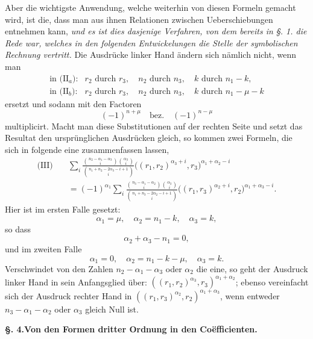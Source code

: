 \documentclass[10pt]{article}
\begin{document}
Aber die wichtigste Anwendung, welche weiterhin von diesen Formeln gemacht wird, ist die, dass man aus ihnen Relationen zwischen Ueberschiebungen entnehmen kann, \emph{und es ist dies dasjenige Verfahren, von dem bereits in §. 1. die Rede war, welches in den folgenden Entwickelungen die Stelle der symbolischen Rechnung vertritt.} Die Ausdrücke linker Hand ändern sich nämlich nicht, wenn man
\[
\begin{array}{ll}
\text{in (II$_a$):} & r_2\text{ durch }r_3,\quad n_2\text{ durch }n_3,\quad k\text{ durch }n_1-k,\\
\text{in (II$_b$):} & r_2\text{ durch }r_3,\quad n_2\text{ durch }n_3,\quad k\text{ durch }n_1-\mu-k
\end{array}
\]
ersetzt und sodann mit den Factoren
\[
(-1)^{n+\mu}\quad\text{bez.}\quad (-1)^{n-\mu}
\]
multiplicirt. Macht man diese Substitutionen auf der rechten Seite und setzt das Resultat den ursprünglichen Ausdrücken gleich, so kommen zwei Formeln, die sich in folgende eine zusammenfassen lassen,
\[
\begin{aligned}
\text{(III)}\quad
&\sum_i\frac{\binom{n_2-\alpha_1-\alpha_3}{i}\binom{\alpha_3}{i}}{\binom{n_1+n_2-2\alpha_3-i+1}{i}}\bigl((r_1,r_2)^{\alpha_3+i},r_3\bigr)^{\alpha_1+\alpha_2-i}\\
&=(-1)^{\alpha_1}\sum_i\frac{\binom{n_3-\alpha_1-\alpha_2}{i}\binom{\alpha_3}{i}}{\binom{n_1+n_3-2\alpha_2-i+1}{i}}\bigl((r_1,r_3)^{\alpha_2+i},r_2\bigr)^{\alpha_1+\alpha_3-i}.
\end{aligned}
\]
Hier ist im ersten Falle gesetzt:
\[
\alpha_1=\mu,\quad \alpha_2=n_1-k,\quad \alpha_3=k,
\]
so dass
\[
\alpha_2+\alpha_3-n_1=0,
\]
und im zweiten Falle
\[
\alpha_1=0,\quad \alpha_2=n_1-k-\mu,\quad \alpha_3=k.
\]
Verschwindet von den Zahlen $n_2-\alpha_1-\alpha_3$ oder $\alpha_2$ die eine, so geht der Ausdruck linker Hand in sein Anfangsglied über: $((r_1,r_2)^{\alpha_3},r_3)^{\alpha_1+\alpha_2}$; ebenso vereinfacht sich der Ausdruck rechter Hand in $((r_1,r_3)^{\alpha_2},r_2)^{\alpha_1+\alpha_3}$, wenn entweder $n_3-\alpha_1-\alpha_2$ oder $\alpha_3$ gleich Null ist.

\begin{center}
{\bfseries §. 4.\quad Von den Formen dritter Ordnung in den Coëfficienten.}
\end{center}
\end{document}
